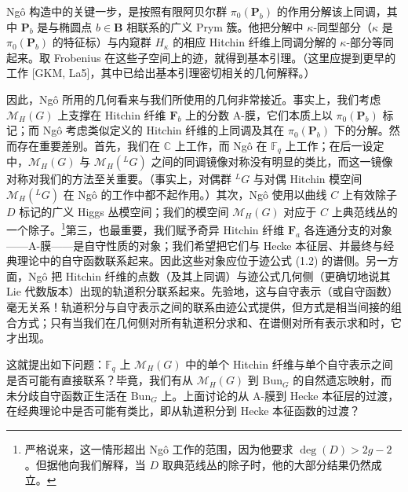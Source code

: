 \documentclass[11pt,a4paper]{article}
\newcommand{\Bun}{\mathrm{Bun}}
\begin{document}
Ngô 构造中的关键一步，是按照有限阿贝尔群 $\pi_0(\boldsymbol{P}_b)$ 的作用分解该上同调，其中 $\boldsymbol{P}_b$ 是与椭圆点 $b\in\boldsymbol{B}$ 相联系的广义 Prym 簇。他把分解中 $\kappa$-同型部分（$\kappa$ 是 $\pi_0(\boldsymbol{P}_b)$ 的特征标）与内窥群 $H_\kappa$ 的相应 Hitchin 纤维上同调分解的 $\kappa$-部分等同起来。取 Frobenius 在这些子空间上的迹，就得到基本引理。（这里应提到更早的工作 [GKM, La5]，其中已给出基本引理密切相关的几何解释。）


因此，Ngô 所用的几何看来与我们所使用的几何非常接近。事实上，我们考虑 $\mathcal{M}_H(G)$ 上支撑在 Hitchin 纤维 $\boldsymbol{F}_b$ 上的分数 A-膜，它们本质上以 $\pi_0(\boldsymbol{P}_b)$ 标记；而 Ngô 考虑类似定义的 Hitchin 纤维的上同调及其在 $\pi_0(\boldsymbol{P}_b)$ 下的分解。然而存在重要差别。首先，我们在 $\mathbb{C}$ 上工作，而 Ngô 在 $\mathbb{F}_q$ 上工作；在后一设定中，$\mathcal{M}_H(G)$ 与 $\mathcal{M}_H({}^{L}G)$ 之间的同调镜像对称没有明显的类比，而这一镜像对称对我们的方法至关重要。（事实上，对偶群 ${}^{L}G$ 与对偶 Hitchin 模空间 $\mathcal{M}_H({}^{L}G)$ 在 Ngô 的工作中都不起作用。）其次，Ngô 使用以曲线 $C$ 上有效除子 $D$ 标记的广义 Higgs 丛模空间；我们的模空间 $\mathcal{M}_H(G)$ 对应于 $C$ 上典范线丛的一个除子。\footnote{严格说来，这一情形超出 Ngô 工作的范围，因为他要求 $\deg(D)>2g-2$。但据他向我们解释，当 $D$ 取典范线丛的除子时，他的大部分结果仍然成立。}第三，也最重要，我们赋予奇异 Hitchin 纤维 $\boldsymbol{F}_a$ 各连通分支的对象——A-膜——是自守性质的对象；我们希望把它们与 Hecke 本征层、并最终与经典理论中的自守函数联系起来。因此这些对象应位于迹公式 (1.2) 的谱侧。另一方面，Ngô 把 Hitchin 纤维的点数（及其上同调）与迹公式几何侧（更确切地说其 Lie 代数版本）出现的轨道积分联系起来。先验地，这与自守表示（或自守函数）毫无关系！轨道积分与自守表示之间的联系由迹公式提供，但方式是相当间接的组合方式；只有当我们在几何侧对所有轨道积分求和、在谱侧对所有表示求和时，它才出现。

这就提出如下问题：$\mathbb{F}_q$ 上 $\mathcal{M}_H(G)$ 中的单个 Hitchin 纤维与单个自守表示之间是否可能有直接联系？毕竟，我们有从 $\mathcal{M}_H(G)$ 到 $\Bun_G$ 的自然遗忘映射，而未分歧自守函数正生活在 $\Bun_G$ 上。上面讨论的从 A-膜到 Hecke 本征层的过渡，在经典理论中是否可能有类比，即从轨道积分到 Hecke 本征函数的过渡？
\end{document}
